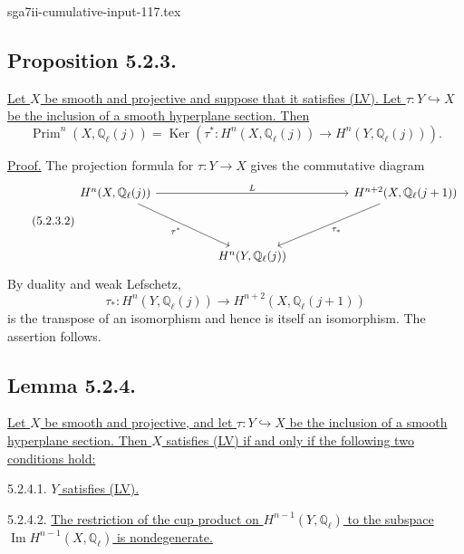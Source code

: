 \begin{filecontents*}{sga7ii-cumulative-input-117.tex}
\subsection*{Proposition 5.2.3.}
\underline{Let $X$ be smooth and projective and suppose that it satisfies
(LV).  Let $\tau:Y\hookrightarrow X$ be the inclusion of a smooth hyperplane
section.  Then}
\begin{equation}\tag{5.2.3.1}
\operatorname{Prim}^n(X,\mathbb Q_\ell(j))
=\operatorname{Ker}\!\left(
\tau^*:H^n(X,\mathbb Q_\ell(j))
\longrightarrow H^n(Y,\mathbb Q_\ell(j))
\right).
\end{equation}

\underline{Proof.}
The projection formula for $\tau:Y\to X$ gives the commutative diagram
\begin{equation}\tag{5.2.3.2}
\begin{tikzcd}[column sep=huge,row sep=huge]
H^n(X,\mathbb Q_\ell(j))
  \arrow[rr,"L"]\arrow[dr,"\tau^*"']
  & {} &
H^{n+2}(X,\mathbb Q_\ell(j+1))
  \arrow[dl,"\tau_*"]\\
{} & H^n(Y,\mathbb Q_\ell(j)) & {}
\end{tikzcd}
\end{equation}
By duality and weak Lefschetz,
\[
\tau_*:H^n(Y,\mathbb Q_\ell(j))
\longrightarrow H^{n+2}(X,\mathbb Q_\ell(j+1))
\]
is the transpose of an isomorphism and hence is itself an isomorphism.  The
assertion follows.

\subsection*{Lemma 5.2.4.}
\underline{Let $X$ be smooth and projective, and let
$\tau:Y\hookrightarrow X$ be the inclusion of a smooth hyperplane section.
Then $X$ satisfies (LV) if and only if the following two conditions hold:}

\smallskip
\noindent
\textup{5.2.4.1.} \underline{$Y$ satisfies (LV).}

\smallskip
\noindent
\textup{5.2.4.2.} \underline{The restriction of the cup product on
$H^{n-1}(Y,\mathbb Q_\ell)$ to the subspace
$\operatorname{Im}H^{n-1}(X,\mathbb Q_\ell)$ is nondegenerate.}


\end{filecontents*}
